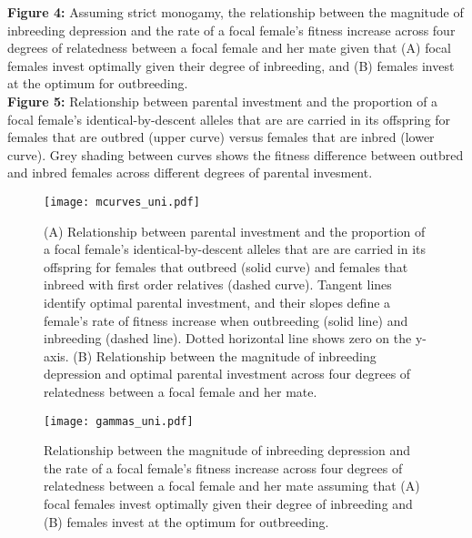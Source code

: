 \documentclass[12pt]{article}
\begin{document}
\noindent \textbf{Figure 4:} Assuming strict monogamy, the relationship between the magnitude of inbreeding depression and the rate of a focal female's fitness increase across four degrees of relatedness between a focal female and her mate given that (A) focal females invest optimally given their degree of inbreeding, and (B) females invest at the optimum for outbreeding. \\

\noindent \textbf{Figure 5:} Relationship between parental investment and the proportion of a focal female's identical-by-descent alleles that are are carried in its offspring for females that are outbred (upper curve) versus females that are inbred (lower curve). Grey shading between curves shows the fitness difference between outbred and inbred females across different degrees of parental invesment. \\

\clearpage
\begin{figure}
\begin{center}				
\texttt{[image: mcurves\_uni.pdf]}
\end{center}
\caption{(A) Relationship between parental investment and the proportion of a focal female's identical-by-descent alleles that are are carried in its offspring for females that outbreed (solid curve) and females that inbreed with first order relatives (dashed curve). Tangent lines identify optimal parental investment, and their slopes define a female's rate of fitness increase when outbreeding (solid line) and inbreeding (dashed line). Dotted horizontal line shows zero on the y-axis. (B) Relationship between the magnitude of inbreeding depression and optimal parental investment across four degrees of relatedness between a focal female and her mate.}
\label{mcurves_uni}
\end{figure}


\clearpage
\begin{figure}
\begin{center}				
\texttt{[image: gammas\_uni.pdf]}
\end{center}
\caption{Relationship between the magnitude of inbreeding depression and the rate of a focal female's fitness increase across four degrees of relatedness between a focal female and her mate assuming that (A) focal females invest optimally given their degree of inbreeding and (B) females invest at the optimum for outbreeding.}
\label{gammas_uni}
\end{figure}
\end{document}
